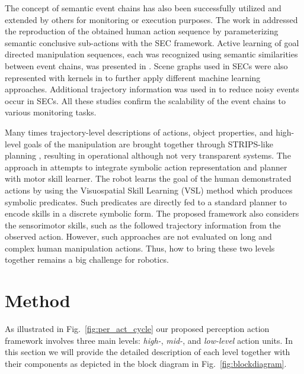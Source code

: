   

The concept of semantic event chains has also  been successfully utilized and extended by others \cite{Waechter2013,Luo2011,Vuga2014,David2014} for monitoring or execution purposes. The work in \cite{Waechter2013} addressed the reproduction of the obtained human action sequence by parameterizing semantic conclusive sub-actions with the SEC framework.
Active learning of goal directed manipulation sequences, each was recognized using semantic similarities between event chains, was presented in \cite{David2014}. Scene graphs used in SECs were also represented with kernels in \cite{Luo2011} to further apply different machine learning approaches. Additional trajectory information was used in \cite{Vuga2014} to reduce noisy events occur in SECs. All these studies confirm the scalability of the event chains to various monitoring tasks.

Many times trajectory-level descriptions of actions, object properties, and high-level goals of the manipulation are brought together through STRIPS-like planning \cite{Dillmann2010}, resulting in operational although not very transparent systems. The approach in \cite{Ahmadzadeh2015} attempts to integrate symbolic action 
representation and planner with motor skill learner. The robot learns the goal of the human demonstrated actions by using
the Visuospatial Skill Learning (VSL) method which produces symbolic predicates. Such predicates are directly fed to a standard planner to encode skills in a discrete symbolic form. The proposed framework also considers the sensorimotor skills, such as the followed trajectory information from
the observed action. However, such approaches are not evaluated on long and complex human manipulation actions. 
Thus, how to bring these two levels together remains a big challenge for robotics.



\clearpage  %

 








\section{Method}
\label{sec:method}

As illustrated in Fig.~\ref{fig:per_act_cycle} our proposed perception action framework involves three main levels: {\it high-}, {\it mid-}, and {\it low-level} action units. In this section we will provide the detailed description of each level together with their components as depicted in the block diagram in Fig.~\ref{fig:blockdiagram}.
  
